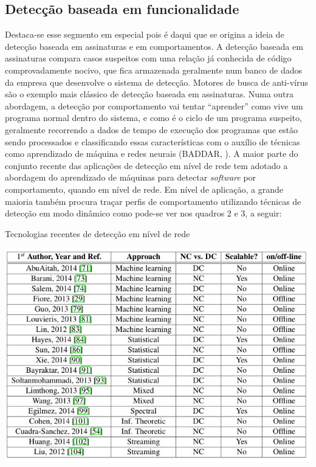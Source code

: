 \subsection{Detecção baseada em funcionalidade}
\label{ss.deteccao_funcionalidade} Destaca-se esse segmento em especial pois é
daqui que se origina a ideia de detecção baseada em assinaturas e em
comportamentos. A detecção baseada em assinaturas compara casos suspeitos com
uma relação já conhecida de código comprovadamente nocivo, que fica armazenada
geralmente num banco de dados da empresa que desenvolve o sistema de detecção.
Motores de busca de anti-vírus são o exemplo mais clássico de detecção baseada
em assinaturas. Numa outra abordagem, a detecção por comportamento vai tentar
``aprender'' como vive um programa normal dentro do sistema, e como é o ciclo
de um programa suspeito, geralmente recorrendo a dados de tempo de execução
dos programas que estão sendo processados e classificando essas
características com o auxílio de técnicas como aprendizado de máquina e redes
neurais (BADDAR, \citeyear{baddarxx}). A maior parte do conjunto recente das aplicações de detecção
em nível de rede tem adotado a abordagem do aprendizado de máquinas para
detectar \textit{software} por comportamento, quando em nível de rede. Em nível de
aplicação, a grande maioria também procura traçar perfis de comportamento
utilizando técnicas de detecção em modo dinâmico como pode-se ver nos quadros
2 e 3, a seguir:

\begin{quadro}[h]
\caption{\small Tecnologias recentes de detecção em nível de rede}
\centering
\includegraphics[scale=0.6]{figs/tabela_deteccao_nivel_rede.JPG}
\label{f.tabeladeteccao_rede}
\end{quadro}

